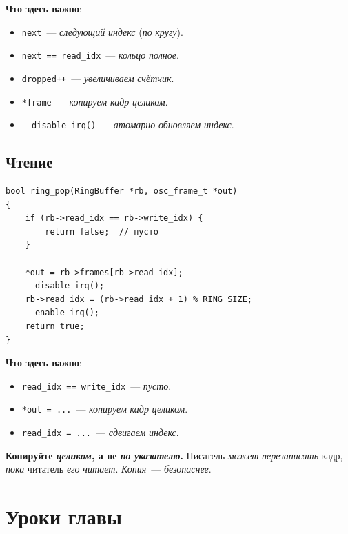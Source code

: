 \textbf{Что здесь важно}:
\begin{itemize}
    \item \texttt{next}~--- \emph{следующий} \emph{индекс}
          (\emph{по} \emph{кругу}).
    \item \texttt{next == read\_idx}~--- \emph{кольцо}
          \emph{полное}.
    \item \texttt{dropped++}~--- \emph{увеличиваем}
          \emph{счётчик}.
    \item \texttt{*frame}~--- \emph{копируем} \emph{кадр}
          \emph{целиком}.
    \item \texttt{\_\_disable\_irq()}~--- \emph{атомарно}
          \emph{обновляем} \emph{индекс}.
\end{itemize}

\subsection{Чтение}

\begin{listing}[htbp]
\begin{verbatim}
bool ring_pop(RingBuffer *rb, osc_frame_t *out)
{
    if (rb->read_idx == rb->write_idx) {
        return false;  // пусто
    }

    *out = rb->frames[rb->read_idx];
    __disable_irq();
    rb->read_idx = (rb->read_idx + 1) % RING_SIZE;
    __enable_irq();
    return true;
}
\end{verbatim}
\caption{\texttt{ring\_pop()}~--- чтение}
\label{lst:ring-pop}
\end{listing}

\textbf{Что здесь важно}:
\begin{itemize}
    \item \texttt{read\_idx == write\_idx}~--- \emph{пусто}.
    \item \texttt{*out = ...}~--- \emph{копируем} \emph{кадр}
          \emph{целиком}.
    \item \texttt{read\_idx = ...}~--- \emph{сдвигаем}
          \emph{индекс}.
\end{itemize}

\begin{warnbox}
\textbf{Копируйте \emph{целиком}, а не \emph{по}
\emph{указателю}.} Писатель \emph{может} \emph{перезаписать}
кадр, \emph{пока} читатель \emph{его} \emph{читает}.
\emph{Копия}~--- \emph{безопаснее}.
\end{warnbox}

\section{Уроки главы}
\label{sec:ring-lessons}

